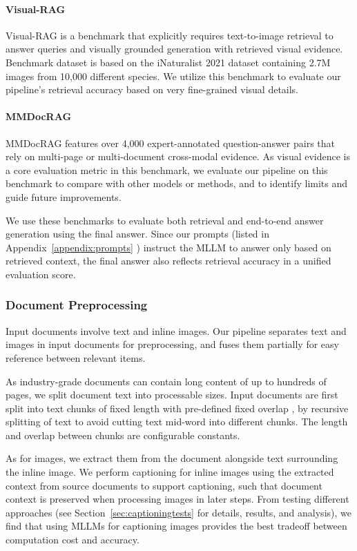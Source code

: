 \paragraph{Visual-RAG}
Visual-RAG \cite{wu2025visualragbenchmarkingtexttoimageretrieval} is a benchmark that explicitly requires text-to-image retrieval 
to answer queries and visually grounded generation with retrieved visual evidence.
Benchmark dataset is based on the iNaturalist 2021 \cite{Van_Horn_2021_CVPR} dataset containing 2.7M images from 10,000 different species.
We utilize this benchmark to evaluate our pipeline's retrieval accuracy based on very fine-grained visual details.

\paragraph{MMDocRAG}
MMDocRAG \cite{dong2025benchmarking} features over 4,000 expert-annotated question-answer pairs that rely on multi-page or multi-document cross-modal evidence.
As visual evidence is a core evaluation metric in this benchmark, we evaluate our pipeline on this benchmark to compare with other models or methods,
and to identify limits and guide future improvements.

We use these benchmarks to evaluate both retrieval and end-to-end answer generation using the final answer.
Since our prompts (listed in Appendix~\ref{appendix:prompts} ) instruct the MLLM to answer only based on retrieved context,
the final answer also reflects retrieval accuracy in a unified evaluation score.

\subsubsection{Document Preprocessing}

Input documents involve text and inline images.
Our pipeline separates text and images in input documents for preprocessing, and fuses them partially for easy reference between relevant items.

As industry-grade documents can contain long content of up to hundreds of pages,
we split document text into processable sizes. 
Input documents are first split into text chunks of fixed length with pre-defined fixed overlap \cite{bansal2023optimizingragchunking},
by recursive splitting of text to avoid cutting text mid-word into different chunks.
The length and overlap between chunks are configurable constants. 

As for images, we extract them from the document alongside text surrounding the inline image.
We perform captioning for inline images using the extracted context from source documents to support captioning,
such that document context is preserved when processing images in later steps.
From testing different approaches (see Section~\ref{sec:captioningtests}  for details, results, and analysis),
we find that using MLLMs for captioning images provides the best tradeoff between computation cost and accuracy.

